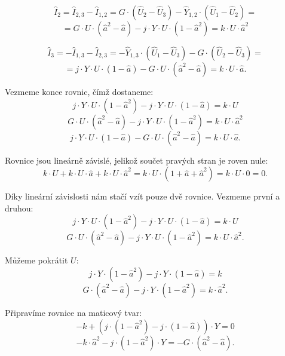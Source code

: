 \documentclass{article}
\begin{document}
$$
    \hat{I}_2 = \hat{I}_{2,3} - \hat{I}_{1,2} = G \cdot \left( \hat{U}_2 - \hat{U}_3 \right) - \hat{Y}_{1,2} \cdot \left( \hat{U}_1 - \hat{U}_2 \right) =
$$
$$
    = G \cdot U \cdot \left( \hat{a}^2 - \hat{a} \right) - j \cdot Y \cdot U \cdot \left( 1 - \hat{a}^2 \right) = k \cdot U \cdot \hat{a}^2
$$

$$
    \hat{I}_3 = - \hat{I}_{1,3} - \hat{I}_{2,3} = - \hat{Y}_{1,3} \cdot \left( \hat{U}_1 - \hat{U}_3 \right) - G \cdot \left( \hat{U}_2 - \hat{U}_3 \right) =
$$
$$
    = j \cdot Y \cdot U \cdot \left( 1 - \hat{a} \right) - G \cdot U \cdot \left( \hat{a}^2 - \hat{a} \right) = k \cdot U \cdot \hat{a}.
$$

Vezmeme konce rovnic, čímž dostaneme:
$$
    j \cdot Y \cdot U \cdot \left( 1 - \hat{a}^2 \right) - j \cdot Y \cdot U \cdot \left( 1 - \hat{a} \right) = k \cdot U
$$
$$
    G \cdot U \cdot \left( \hat{a}^2 - \hat{a} \right) - j \cdot Y \cdot U \cdot \left( 1 - \hat{a}^2 \right) = k \cdot U \cdot \hat{a}^2
$$
$$
    j \cdot Y \cdot U \cdot \left( 1 - \hat{a} \right) - G \cdot U \cdot \left( \hat{a}^2 - \hat{a} \right) = k \cdot U \cdot \hat{a}.
$$

Rovnice jsou lineárně závislé, jelikož součet pravých stran je roven nule:
$$
    k \cdot U + k \cdot U \cdot \hat{a} + k \cdot U \cdot \hat{a}^2 = k \cdot U \cdot \left( 1 + \hat{a} + \hat{a}^2 \right) = k \cdot U \cdot 0 = 0.
$$

Díky lineární závislosti nám stačí vzít pouze dvě rovnice. Vezmeme první a druhou:
$$
    j \cdot Y \cdot U \cdot (1 - \hat{a}^2) - j \cdot Y \cdot U \cdot (1 - \hat{a}) = k \cdot U
$$
$$
    G \cdot U \cdot (\hat{a}^2 - \hat{a}) - j \cdot Y \cdot U \cdot (1 - \hat{a}^2) = k \cdot U \cdot \hat{a}^2.
$$

Můžeme pokrátit $U$:
$$
    j \cdot Y \cdot (1 - \hat{a}^2) - j \cdot Y \cdot (1 - \hat{a}) = k
$$
$$
    G \cdot (\hat{a}^2 - \hat{a}) - j \cdot Y \cdot (1 - \hat{a}^2) = k \cdot \hat{a}^2.
$$

Připravíme rovnice na maticový tvar:
$$
    -k + \left( j \cdot (1 - \hat{a}^2) - j \cdot (1 - \hat{a}) \right) \cdot Y = 0
$$
$$
    -k \cdot \hat{a}^2 - j \cdot (1 - \hat{a}^2) \cdot Y = -G \cdot (\hat{a}^2 - \hat{a}).
$$
\end{document}

